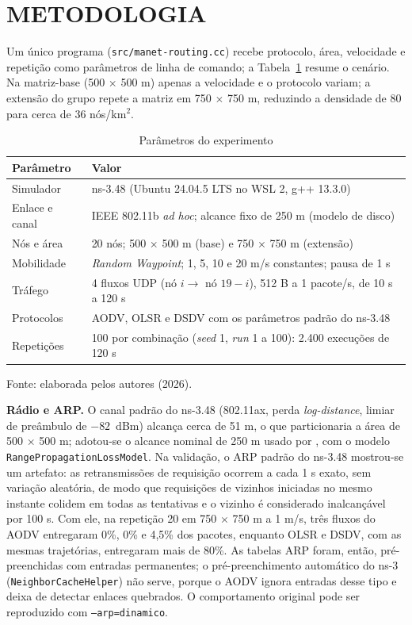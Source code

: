 \documentclass[12pt]{article}
\begin{document}
\section{METODOLOGIA}

Um único programa (\texttt{src/manet-routing.cc}) recebe protocolo, área, velocidade e repetição como parâmetros de linha de comando; a Tabela~\ref{tab:parametros} resume o cenário. Na matriz-base (500 $\times$ 500 m) apenas a velocidade e o protocolo variam; a extensão do grupo repete a matriz em 750 $\times$ 750 m, reduzindo a densidade de 80 para cerca de 36 nós/km$^2$.

\begin{table}[ht]
\centering
\caption{Parâmetros do experimento}
\label{tab:parametros}
\small
\begin{tabular}{@{}ll@{}}
\toprule
\textbf{Parâmetro} & \textbf{Valor} \\
\midrule
Simulador & ns-3.48 (Ubuntu 24.04.5 LTS no WSL 2, g++ 13.3.0) \\
Enlace e canal & IEEE 802.11b \textit{ad hoc}; alcance fixo de 250 m (modelo de disco) \\
Nós e área & 20 nós; 500 $\times$ 500 m (base) e 750 $\times$ 750 m (extensão) \\
Mobilidade & \textit{Random Waypoint}; 1, 5, 10 e 20 m/s constantes; pausa de 1 s \\
Tráfego & 4 fluxos UDP (nó $i \rightarrow$ nó $19-i$), 512 B a 1 pacote/s, de 10 s a 120 s \\
Protocolos & AODV, OLSR e DSDV com os parâmetros padrão do ns-3.48 \\
Repetições & 100 por combinação (\textit{seed} 1, \textit{run} 1 a 100): 2.400 execuções de 120 s \\
\bottomrule
\end{tabular}

\footnotesize Fonte: elaborada pelos autores (2026).
\end{table}

\textbf{Rádio e ARP.} O canal padrão do ns-3.48 (802.11ax, perda \textit{log-distance}, limiar de preâmbulo de $-82$~dBm) alcança cerca de 51 m, o que particionaria a área de 500 $\times$ 500 m; adotou-se o alcance nominal de 250 m usado por , com o modelo \texttt{RangePropagationLossModel}. Na validação, o ARP padrão do ns-3.48 mostrou-se um artefato: as retransmissões de requisição ocorrem a cada 1 s exato, sem variação aleatória, de modo que requisições de vizinhos iniciadas no mesmo instante colidem em todas as tentativas e o vizinho é considerado inalcançável por 100 s. Com ele, na repetição 20 em 750 $\times$ 750 m a 1 m/s, três fluxos do AODV entregaram 0\%, 0\% e 4,5\% dos pacotes, enquanto OLSR e DSDV, com as mesmas trajetórias, entregaram mais de 80\%. As tabelas ARP foram, então, pré-preenchidas com entradas permanentes; o pré-preenchimento automático do ns-3 (\texttt{NeighborCacheHelper}) não serve, porque o AODV ignora entradas desse tipo e deixa de detectar enlaces quebrados. O comportamento original pode ser reproduzido com \texttt{--arp=dinamico}.
\end{document}
